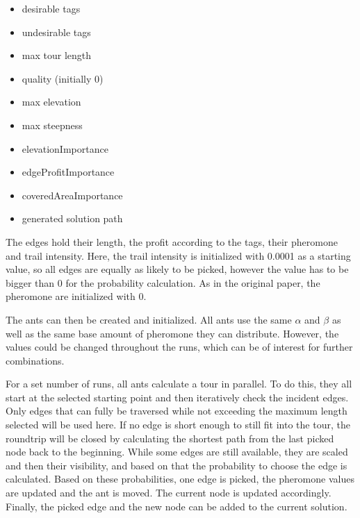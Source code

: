\begin{minipage}[t][2cm][b]{0.3\textwidth}
	\begin{itemize}
		\item desirable tags
		\item undesirable tags
		\item max tour length
	
	\end{itemize}
\end{minipage}
\begin{minipage}[t][2cm][b]{0.3\textwidth}
	\begin{itemize}
		\item quality (initially 0)
		\item max elevation
		\item max steepness
	\end{itemize}	
\end{minipage}
\begin{minipage}[t][2.9cm][b]{0.33\textwidth}
	\begin{itemize}
		\item elevationImportance
		\item edgeProfitImportance
		\item coveredAreaImportance
		\item generated solution path
	\end{itemize}	
\end{minipage}

\vspace{1cm}
The edges hold their length, the profit according to the tags, their pheromone and trail intensity. 
Here, the trail intensity is initialized with 0.0001 as a starting value, so all edges are equally as likely to be picked, however the value has to be bigger than 0 for the probability calculation.
As in the original paper, the pheromone are initialized with 0.

The ants can then be created and initialized. 
All ants use the same $\alpha$ and $\beta$ as well as the same base amount of pheromone they can distribute.
However, the values could be changed throughout the runs, which can be of interest for further combinations.

For a set number of runs, all ants calculate a tour in parallel. 
To do this, they all start at the selected starting point and then iteratively check the incident edges.
Only edges that can fully be traversed while not exceeding the maximum length selected will be used here.
If no edge is short enough to still fit into the tour, the roundtrip will be closed by calculating the shortest path from the last picked node back to the beginning.
While some edges are still available, they are scaled and then their visibility, and based on that the probability to choose the edge is calculated. 
Based on these probabilities, one edge is picked, the pheromone values are updated and the ant is moved.
The current node is updated accordingly. 
Finally, the picked edge and the new node can be added to the current solution.

